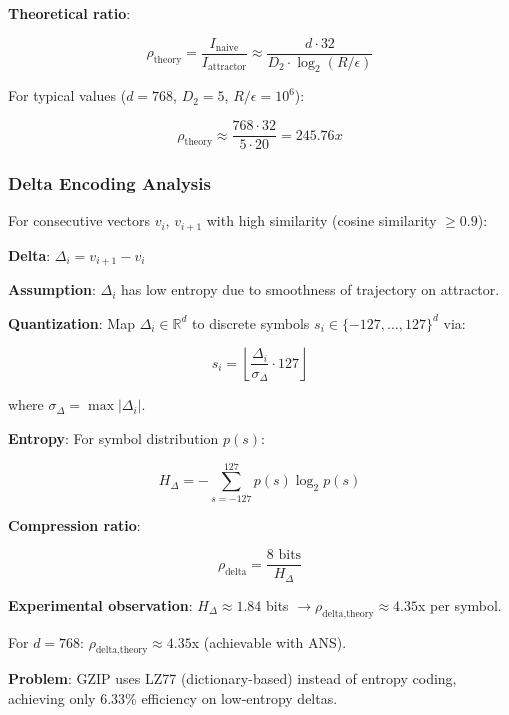\documentclass[11pt,a4paper]{article}
\begin{document}
\textbf{Theoretical ratio}:

\begin{equation}
\rho_{\text{theory}} = \frac{I_{\text{naive}}}{I_{\text{attractor}}} \approx \frac{d \cdot 32}{D_2 \cdot \log_2(R/\epsilon)}
\end{equation}

For typical values ($d=768$, $D_2=5$, $R/\epsilon=10^6$):

\begin{equation}
\rho_{\text{theory}} \approx \frac{768 \cdot 32}{5 \cdot 20} = 245.76x
\end{equation}

\subsubsection{Delta Encoding Analysis}

For consecutive vectors $v_i$, $v_{i+1}$ with high similarity (cosine similarity $\geq 0.9$):

\textbf{Delta}: $\Delta_i = v_{i+1} - v_i$

\textbf{Assumption}: $\Delta_i$ has low entropy due to smoothness of trajectory on attractor.

\textbf{Quantization}: Map $\Delta_i \in \mathbb{R}^d$ to discrete symbols $s_i \in \{-127, \ldots, 127\}^d$ via:

\begin{equation}
s_i = \left\lfloor \frac{\Delta_i}{\sigma_\Delta} \cdot 127 \right\rfloor
\end{equation}

where $\sigma_\Delta = \max |\Delta_i|$.

\textbf{Entropy}: For symbol distribution $p(s)$:

\begin{equation}
H_\Delta = -\sum_{s=-127}^{127} p(s) \log_2 p(s)
\end{equation}

\textbf{Compression ratio}:

\begin{equation}
\rho_{\text{delta}} = \frac{8 \text{ bits}}{H_\Delta}
\end{equation}

\textbf{Experimental observation}: $H_\Delta \approx 1.84$ bits $\to \rho_{\text{delta,theory}} \approx 4.35$x per symbol.

For $d = 768$: $\rho_{\text{delta,theory}} \approx 4.35$x (achievable with ANS).

\textbf{Problem}: GZIP uses LZ77 (dictionary-based) instead of entropy coding, achieving only 6.33\% efficiency on low-entropy deltas.
\end{document}
